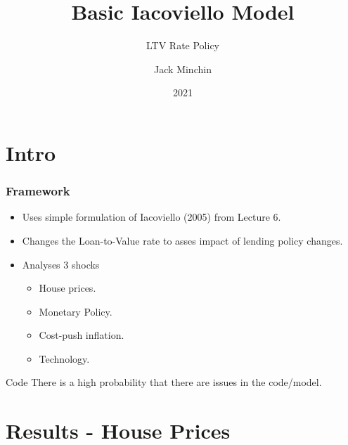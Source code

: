 \documentclass{beamer}
\title{Basic Iacoviello Model}
\subtitle{LTV Rate Policy}
\author{Jack Minchin}
\date{2021}
\begin{document}
\frame{\titlepage}

\section{Intro}

\begin{frame}
\frametitle{Framework}
\begin{itemize}
  \item Uses simple formulation of Iacoviello (2005) from Lecture 6.
  \item Changes the Loan-to-Value rate to asses impact of lending policy changes. 
  \item Analyses 3 shocks
 	\begin{itemize}
  		\item House prices.
  		\item Monetary Policy.
  		\item Cost-push inflation.
  		\item Technology.
	\end{itemize}
\end{itemize}
\begin{alertblock}{Code}
There is a high probability that there are issues in the code/model.
\end{alertblock}
\end{frame}

\section{Results - House Prices}
\end{document}
